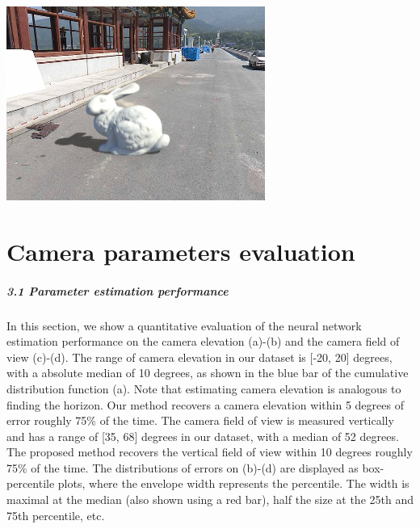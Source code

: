 \begin{multicols}{3}
\includegraphics[width=\mywidth]{pano_aqiyqsmecvspfu.jpg}

\end{multicols}

\protect\hypertarget{camparameval}{}{}

\hypertarget{camera-parameters-evaluation}{%
\section{Camera parameters
evaluation}\label{camera-parameters-evaluation}}

\protect\hypertarget{camparamestimperf}{}{}

\hypertarget{parameter-estimation-performance}{%
\subparagraph{3.1 Parameter estimation
performance}\label{parameter-estimation-performance}}

In this section, we show a quantitative evaluation of the neural network
estimation performance on the camera elevation (a)-(b) and the camera
field of view (c)-(d). The range of camera elevation in our dataset is
{[}-20, 20{]} degrees, with a absolute median of 10 degrees, as shown in
the blue bar of the cumulative distribution function (a). Note that
estimating camera elevation is analogous to finding the horizon. Our
method recovers a camera elevation within 5 degrees of error roughly
75\% of the time. The camera field of view is measured vertically and
has a range of {[}35, 68{]} degrees in our dataset, with a median of 52
degrees. The proposed method recovers the vertical field of view within
10 degrees roughly 75\% of the time. The distributions of errors on
(b)-(d) are displayed as box-percentile plots, where the envelope width
represents the percentile. The width is maximal at the median (also
shown using a red bar), half the size at the 25th and 75th percentile,
etc.


